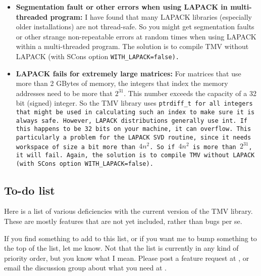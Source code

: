 \begin{itemize}
\item {\bf Segmentation fault or other errors when using LAPACK in multi-threaded program:}
I have found that many LAPACK libraries (especially older installations) 
are not thread-safe.  So you might get segmentation faults or other strange
non-repeatable errors at random times when using LAPACK within a multi-threaded
program.  The solution is to compile TMV without LAPACK (with SCons option
\tt{WITH_LAPACK=false}).

\item {\bf LAPACK fails for extremely large matrices:}
For matrices that use more than 2 GBytes of memory, the integers that index the memory addresses need to be more that $2^{31}$.  This number exceeds the capacity of a 32 bit (signed) integer.  So the TMV library uses \tt{ptrdiff_t} for all integers that might be used in calculating such an index to make sure it is always safe.  However, LAPACK distributions generally use \tt{int}.  If this happens to be 32 bits on your machine, it can overflow.  This particularly a problem for the LAPACK SVD routine, since it needs workspace of size a bit more than $4n^2$.  So if $4n^2$ is more than $2^{31}$, it will fail.  Again, the solution is to compile TMV without LAPACK (with SCons option \tt{WITH_LAPACK=false}).

\end{itemize}

\subsection{To-do list}
\label{To_Do_List}

Here is a list of various deficiencies with the current version of the TMV library.
These are mostly features that are not yet included, rather than bugs per se.

If you find something to add to this list, or if you want me to bump something
to the top of the list, let me know.  Not that the list is currently in any kind of 
priority order, but you know what I mean.  Please post a feature request
at \myissues, or email the discussion group about what you need at \mygroup.

